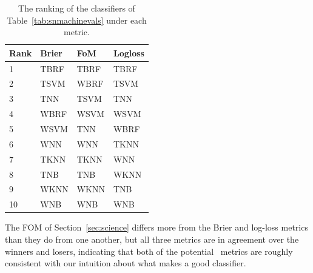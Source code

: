 \begin{table}[]
\begin{tabular}{llll}
Rank & Brier           & FoM             & Logloss       \\
\hline
1 & TBRF	& TBRF 	& TBRF \\
2 & TSVM 	& WBRF	& TSVM \\
3 & TNN 	& TSVM	& TNN \\
4 & WBRF 	& WSVM	& WSVM \\
5 & WSVM 	& TNN		& WBRF \\
6 & WNN 	& WNN		& TKNN \\
7 & TKNN 	& TKNN	& WNN \\
8 & TNB 	& TNB		& WKNN \\
9 & WKNN 	& WKNN	& TNB \\
10 & WNB 	& WNB		& WNB \\
\end{tabular}
\caption{The ranking of the classifiers of Table~\ref{tab:snmachinevals} under each metric.}
\label{tab:snmachinerank}
\end{table}

The FOM of Section~\ref{sec:science} differs more from the Brier and log-loss metrics than they do from one another, but all three metrics are in agreement over the winners and losers, indicating that both of the potential \plasticc\ metrics are roughly consistent with our intuition about what makes a good classifier.

